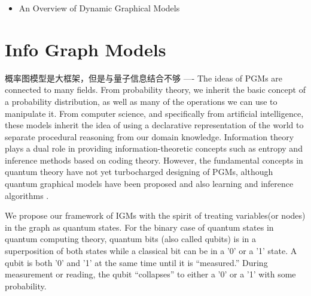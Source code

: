 \documentclass{article}
\theoremstyle{definition}
\theoremstyle{remark}
\theoremstyle{definition}
\begin{document}
\begin{CJK*}{UTF8}{gbsn}
\begin{itemize}
    \item An Overview of Dynamic Graphical Models
\end{itemize}

\section{Info Graph Models}

概率图模型是大框架，但是与量子信息结合不够 ----
The ideas of PGMs are connected to many fields. From probability theory, we inherit the basic concept of a probability distribution, as well as many of the operations we can use to manipulate it. From computer science, and specifically from artificial intelligence, these models inherit the idea of using a declarative representation of the world to separate procedural reasoning from our domain knowledge. Information theory plays a dual role in providing information-theoretic concepts such as entropy and inference methods based on coding theory. However, the fundamental concepts in quantum theory have not yet turbocharged designing of PGMs, although quantum graphical models have been proposed and also learning and inference algorithms \cite{srinivasan2018learning, leifer2008quantum, jouneghani2013review}. 

We propose our framework of IGMs with the spirit of treating variables(or nodes) in the graph as quantum states. For the binary case of quantum states in quantum computing theory, quantum bits (also called qubits) is in a superposition of both states while a classical bit can be in a '0' or a '1' state. A qubit is both '0' and '1' at the same time until it is “measured.” During measurement or reading, the qubit “collapses” to either a '0' or a '1' with some probability.




\end{CJK*}
\end{document}
